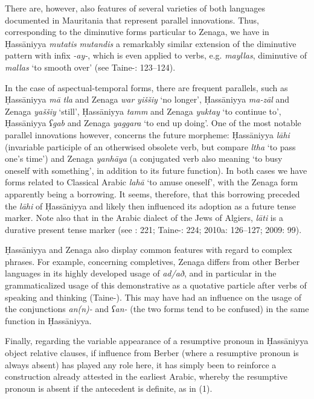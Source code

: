 \documentclass[output=paper]{langsci/langscibook}
\begin{document}
There are, however, also features of several varieties of both languages documented in Mauritania that represent parallel innovations. Thus, corresponding to the diminutive forms particular to Zenaga, we have in Ḥassāniyya \textit{mutatis} \textit{mutandis} a remarkably similar extension of the diminutive pattern with infix \textit{{}-}\textit{ay-}, which is even applied to verbs, e.g. \textit{mayllas}, diminutive of \textit{mallas} ‘to smooth over’ (see Taine-\citealt{Cheikh2008a}: 123–124).

In the case of aspectual-temporal forms, there are frequent parallels, such as Ḥassāniyya \textit{mā} \textit{tla} and Zenaga \textit{war} \textit{yiššiy} ‘no longer’, Ḥassāniyya \textit{ma-zāl} and Zenaga \textit{yaššiy} ‘still’, Ḥassāniyya \textit{tamm} and Zenaga \textit{yuktay} ‘to continue to’, Ḥassāniyya \textit{ʕgab} and Zenaga \textit{yaggara} ‘to end up doing’. One of the most notable parallel innovations however, concerns the future morpheme: Ḥassāniyya \textit{lāhi} (invariable participle of an otherwised obsolete verb, but compare \textit{ltha} ‘to pass one’s time’) and Zenaga \textit{yanhāya} (a conjugated verb also meaning ‘to busy oneself with something’, in addition to its future function). In both cases we have forms related to Classical Arabic \textit{lahā} ‘to amuse oneself’, with the Zenaga form apparently being a borrowing. It seems, therefore, that this borrowing preceded the \textit{lāhi} of Ḥassāniyya and likely then influenced its adoption as a future tense marker. Note also that in the Arabic dialect of the Jews of Algiers, \textit{lāti} is a durative present tense marker (see \citealt{Cohen1924}: 221; Taine-\citealt{Cheikh2004}: 224; 2010a: 126–127; 2009: 99).

Ḥassāniyya and Zenaga also display common features with regard to complex phrases. For example, concerning completives, Zenaga differs from other Berber languages in its highly developed usage of \textit{ad/að}, and in particular in the grammaticalized usage of this demonstrative as a quotative particle after verbs of speaking and thinking (Taine-\citealt{Cheikh2010a}). This may have had an influence on the usage of the conjunctions \textit{an(n)-} and \textit{ʕan-} (the two forms tend to be confused) in the same function in Ḥassāniyya.

Finally, regarding the variable appearance of a resumptive pronoun in Ḥassāniyya object relative clauses, if influence from Berber (where a resumptive pronoun is always absent) has played any role here, it has simply been to reinforce a construction already attested in the earliest Arabic, whereby the resumptive pronoun is absent if the antecedent is definite, as in ‎(1).
\end{document}
